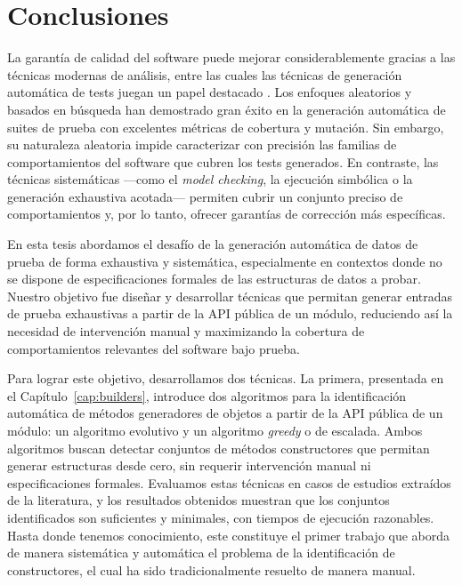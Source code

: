 \chapter{Conclusiones}
\label{cap:conclutions}

La garantía de calidad del software puede mejorar considerablemente gracias a las técnicas modernas de análisis, 
entre las cuales las técnicas de generación automática de tests juegan un papel destacado \cite{Cadar08, Luckow14, Fraser11, Pacheco07, Ma15, Godefroid05, Marinov01, Boyapati02,Godefroid12}. 
Los enfoques aleatorios y basados en búsqueda han demostrado gran éxito en la generación automática de suites de prueba con excelentes métricas de cobertura y mutación. 
Sin embargo, su naturaleza aleatoria impide caracterizar con precisión las familias de comportamientos del software que cubren los tests generados. 
En contraste, las técnicas sistemáticas —como el \emph{model checking}, la ejecución simbólica o la generación exhaustiva acotada— permiten cubrir un conjunto preciso de comportamientos 
y, por lo tanto, ofrecer garantías de corrección más específicas.

En esta tesis abordamos el desafío de la generación automática de datos de prueba de forma exhaustiva y sistemática, 
especialmente en contextos donde no se dispone de especificaciones formales de las estructuras de datos a probar. 
Nuestro objetivo fue diseñar y desarrollar técnicas que permitan generar entradas de prueba exhaustivas a partir de la API pública de un módulo, 
reduciendo así la necesidad de intervención manual y maximizando la cobertura de comportamientos relevantes del software bajo prueba.

Para lograr este objetivo, desarrollamos dos técnicas. La primera, presentada en el Capítulo~\ref{cap:builders}, 
introduce dos algoritmos para la identificación automática de métodos generadores de objetos a partir de la API pública de un módulo: un algoritmo evolutivo y un algoritmo \emph{greedy} o de escalada.
Ambos algoritmos buscan detectar conjuntos de métodos constructores que permitan generar estructuras desde cero, 
sin requerir intervención manual ni especificaciones formales. 
Evaluamos estas técnicas en casos de estudios extraídos de la literatura, 
y los resultados obtenidos muestran que los conjuntos identificados son suficientes y minimales, con tiempos de ejecución razonables. 
Hasta donde tenemos conocimiento, este constituye el primer trabajo que aborda de manera sistemática y automática el problema de la identificación de constructores, el cual ha sido tradicionalmente resuelto de manera manual.

